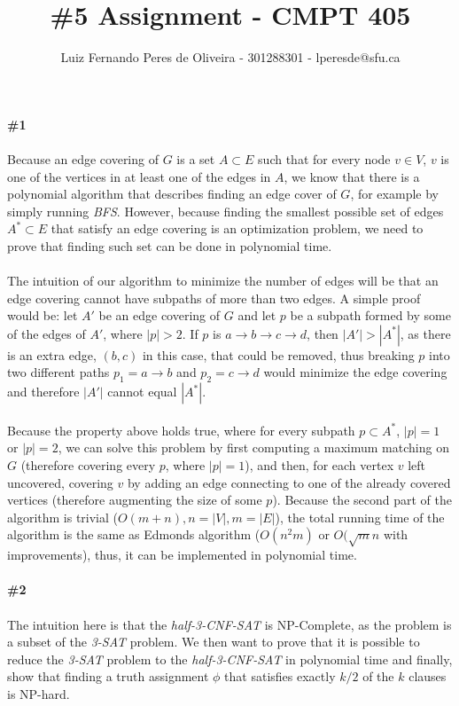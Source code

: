 \documentclass{article}
\title{\#5 Assignment - CMPT 405}
\author{Luiz Fernando Peres de Oliveira - 301288301 - lperesde@sfu.ca}
\begin{document}
\maketitle
\textbf{\#1}
\\
\\
Because an edge covering of $G$ is a set $A \subset E$ such that for every node $v \in V$, $v$ is one of the vertices in at least one of the edges in $A$, we know that there is a polynomial algorithm that describes finding an edge cover of $G$, for example by simply running \textit{BFS}. However, because finding the smallest possible set of edges $A^* \subset E$ that satisfy an edge covering is an optimization problem, we need to prove that finding such set can be done in polynomial time.
\\
\\
The intuition of our algorithm to minimize the number of edges will be that an edge covering cannot have subpaths of more than two edges. A simple proof would be: let $A'$ be an edge covering of $G$ and let $p$ be a subpath formed by some of the edges of $A'$, where $|p| > 2$. If $p$ is $a \rightarrow b \rightarrow c \rightarrow d$, then $|A'| > |A^*|$, as there is an extra edge, $(b, c)$ in this case, that could be removed, thus breaking $p$ into two different paths $p_1 = a \rightarrow b$ and $p_2 = c \rightarrow d$ would minimize the edge covering and therefore $|A'|$ cannot equal $|A^*|$.
\\
\\
Because the property above holds true, where for every subpath $p \subset A^*$, $|p| = 1$ or $|p| = 2$, we can solve this problem by first computing a maximum matching on $G$ (therefore covering every $p$, where $|p| = 1$), and then, for each vertex $v$ left uncovered, covering $v$ by adding an edge connecting to one of the already covered vertices (therefore augmenting the size of some $p$). Because the second part of the algorithm is trivial ($O(m+n), n = |V|, m = |E|$), the total running time of the algorithm is the same as Edmonds algorithm ($O(n^2m)$ or $O(\sqrt{m}n$ with improvements), thus, it can be implemented in polynomial time.
\\
\\
\textbf{\#2}
\\
\\
The intuition here is that the \textit{half-3-CNF-SAT} is NP-Complete, as the problem is a subset of the \textit{3-SAT} problem. We then want to prove that it is possible to reduce the \textit{3-SAT} problem to the \textit{half-3-CNF-SAT} in polynomial time and finally, show that finding a truth assignment $\phi$ that satisfies exactly $k/2$ of the $k$ clauses is NP-hard.
\end{document}
